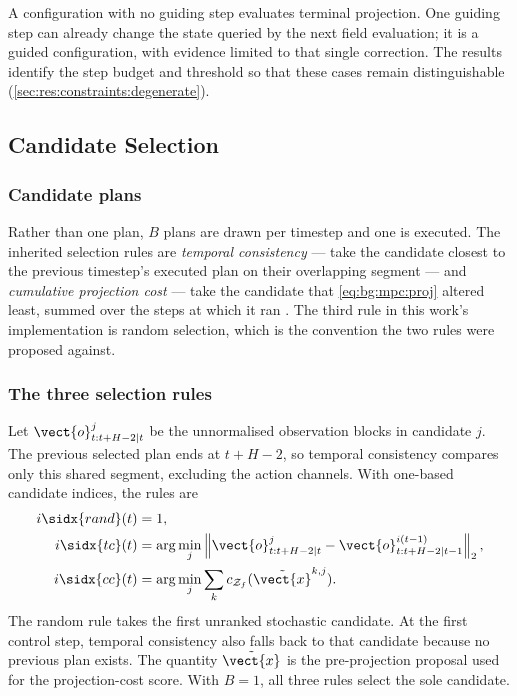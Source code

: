 A configuration with no guiding step evaluates terminal projection. One guiding step can already
change the state queried by the next field evaluation; it is a guided configuration, with evidence
limited to that single correction. The results identify the step budget and threshold so that these
cases remain distinguishable (\autoref{sec:res:constraints:degenerate}).

\subsection{Candidate Selection}\label{sec:method:selection}

\subsubsection*{Candidate plans}

Rather than one plan, $B$ plans are drawn per timestep and one is executed. The inherited
selection rules are \emph{temporal consistency} --- take the candidate closest to the previous
timestep's executed plan on their overlapping segment --- and \emph{cumulative projection
cost} --- take the candidate that \eqref{eq:bg:mpc:proj} altered least, summed over the steps
at which it ran \parencite[Sec.~5.4]{romer2025diffusion}. The third rule in this work's implementation is random selection,
which is the convention the two rules were proposed against.

\subsubsection*{The three selection rules}

Let $\vect{o}^{j}_{t:t+H-2|t}$ be the unnormalised observation blocks in candidate $j$.
The previous selected plan ends at $t+H-2$, so temporal consistency compares only this shared
segment, excluding the action channels. With one-based candidate indices, the rules are
\begin{equation}\label{eq:method:sel:rules}
\begin{aligned}
  i\sidx{rand}(t)&=1,\\
  i\sidx{tc}(t)&=\arg\min_j\left\|\vect{o}^{j}_{t:t+H-2|t}
                -\vect{o}^{i(t-1)}_{t:t+H-2|t-1}\right\|_2,\\
  i\sidx{cc}(t)&=\arg\min_j\sum_k c_{\mathcal{Z}_f}(\tilde{\vect{x}}^{k,j}).
\end{aligned}
\end{equation}
The random rule takes the first unranked stochastic candidate. At the first control step, temporal
consistency also falls back to that candidate because no previous plan exists. The quantity
$\tilde{\vect{x}}$ is the pre-projection proposal used for the projection-cost score. With $B=1$,
all three rules select the sole candidate.

